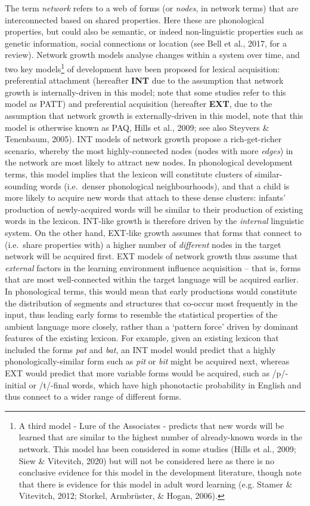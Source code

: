 \documentclass[
  man]{apa6}
\begin{document}
The term \emph{network} refers to a web of forms (or \emph{nodes}, in network terms) that are interconnected based on shared properties. Here these are phonological properties, but could also be semantic, or indeed non-linguistic properties such as genetic information, social connections or location (see Bell et al., 2017, for a review). Network growth models analyse changes within a system over time, and two key models\footnote{A third model - Lure of the Associates - predicts that new words will be learned that are similar to the highest number of already-known words in the network. This model has been considered in some studies (Hills et al., 2009; Siew \& Vitevitch, 2020) but will not be considered here as there is no conclusive evidence for this model in the development literature, though note that there is evidence for this model in adult word learning (e.g. Stamer \& Vitevitch, 2012; Storkel, Armbrüster, \& Hogan, 2006).} of development have been proposed for lexical acquisition: preferential attachment (hereafter \textbf{INT} due to the assumption that network growth is internally-driven in this model; note that some studies refer to this model as PATT) and preferential acquisition (hereafter \textbf{EXT}, due to the assumption that network growth is externally-driven in this model, note that this model is otherwise known as PAQ, Hills et al., 2009; see also Steyvers \& Tenenbaum, 2005). INT models of network growth propose a rich-get-richer scenario, whereby the most highly-connected nodes (nodes with more \emph{edges}) in the network are most likely to attract new nodes. In phonological development terms, this model implies that the lexicon will constitute clusters of similar-sounding words (i.e.~denser phonological neighbourhoods), and that a child is more likely to acquire new words that attach to these dense clusters: infants' production of newly-acquired words will be similar to their production of existing words in the lexicon. INT-like growth is therefore driven by the \emph{internal} linguistic system. On the other hand, EXT-like growth assumes that forms that connect to (i.e.~share properties with) a higher number of \emph{different} nodes in the target network will be acquired first. EXT models of network growth thus assume that \emph{external} factors in the learning environment influence acquisition -- that is, forms that are most well-connected within the target language will be acquired earlier. In phonological terms, this would mean that early productions would constitute the distribution of segments and structures that co-occur most frequently in the input, thus leading early forms to resemble the statistical properties of the ambient language more closely, rather than a `pattern force' driven by dominant features of the existing lexicon. For example, given an existing lexicon that included the forms \emph{pat} and \emph{bat}, an INT model would predict that a highly phonologically-similar form such as \emph{pit} or \emph{bit} might be acquired next, whereas EXT would predict that more variable forms would be acquired, such as /p/-initial or /t/-final words, which have high phonotactic probability in English and thus connect to a wider range of different forms.
\end{document}
